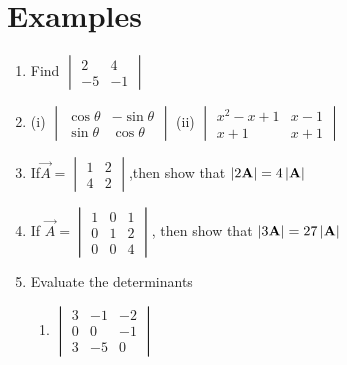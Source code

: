 \documentclass[journal,12pt,twocolumn]{IEEEtran}
\renewcommand\thesection{\arabic{section}}
\begin{document}
\section{Examples}
\renewcommand{\theequation}{\theenumi}
\begin{enumerate}[label=\thesection.\arabic*.,ref=\thesection.\theenumi]

\item Find 
$\begin{vmatrix}
2&4\\-5&-1
\end{vmatrix}$
\\
\solution 


\item (i) $\begin{vmatrix}\cos\theta& -\sin\theta\\ \sin\theta& \cos\theta \end{vmatrix}$ 
(ii) $\begin{vmatrix}
x^2-x+1& x-1\\ x+1&  x+1
\end{vmatrix}$
\\
\solution 

\item If$ \vec{A} = \begin{vmatrix}1&2\\4&2\end{vmatrix}$,then show that  
$\left\vert2\mathbf{A}\right\vert=4\left\vert\mathbf{A}\right\vert$
\\
\solution 

\item If $\vec{A}=\begin{vmatrix}1&0&1\\0&1&2\\0&0&4\end{vmatrix}$, then show that $\left\vert3\mathbf{A}\right\vert=27\left\vert\mathbf{A}\right\vert$
\\
\solution 

\item Evaluate the determinants
\begin{enumerate}
\item $\begin{vmatrix}
3&-1&-2\\0&0&-1\\3&-5&0
\end{vmatrix}$

\end{enumerate}
\end{enumerate}
\end{document}
